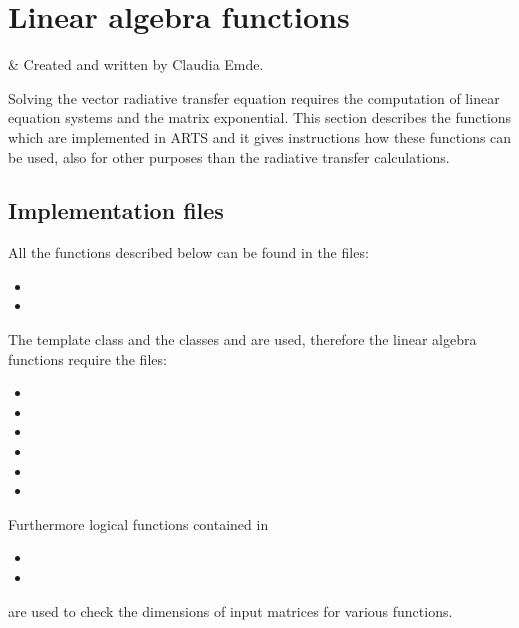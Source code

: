 \chapter{Linear algebra functions}
\label{sec:lin_alg}

 & Created and written by Claudia Emde.\\
\stophistory

%
%

Solving the vector radiative transfer equation requires the
computation of linear equation systems and the matrix
exponential. This section describes the functions which are implemented
in ARTS and it gives instructions how these functions can be used, also
for other purposes than the radiative transfer calculations.

\section{Implementation files}
\label{sec:lin_alg:files}

All the functions described below can be found in the files:
\begin{itemize}
\item {}
\item {}
\end{itemize}
The template class  and the classes  and
 are used, therefore the linear algebra functions require
the files:
\begin{itemize}
\item {}
\item {}
\item {}
\item {}
\item {}
\item {}
\end{itemize}
Furthermore logical functions contained in
\begin{itemize}
\item {}
\item {}
\end{itemize}
are used to check the dimensions of input matrices for various functions.


